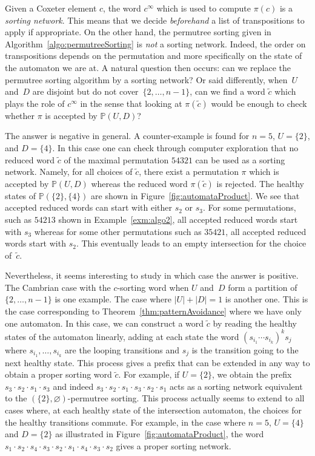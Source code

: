 \documentclass[ALCO]{cedram}
\newcommand{\defn}[1]{\textsl{\color{darkblue} #1}}
\newcommand{\automatonP}{\mathbb{P}}
\begin{document}
\begin{remark}
Given a Coxeter element $c$, the word $c^\infty$ which is used to compute $\pi(c)$ is a \defn{sorting network}. This means that we decide \emph{beforehand} a list of transpositions to apply if appropriate. On the other hand, the permutree sorting given in Algorithm~\ref{algo:permutreeSorting} is \emph{not} a sorting network. Indeed, the order on transpositions depends on the permutation and more specifically on the state of the automaton we are at. A natural question then occurs: can we replace the permutree sorting algorithm by a sorting network? Or said differently, when~$U$ and~$D$ are disjoint but do not cover~$\{2, \dots, n-1\}$, can we find a word $\tilde{c}$ which plays the role of $c^\infty$ in the sense that looking at $\pi(\tilde{c})$ would be enough to check whether $\pi$ is accepted by $\automatonP(U,D)$?

The answer is negative in general. A counter-example is found for $n = 5$, $U = \{ 2\}$, and $D=\{ 4 \}$. In this case one can check through computer exploration that no reduced word $\tilde{c}$ of the maximal permutation $54321$ can be used as a sorting network. Namely, for all choices of $\tilde{c}$, there exist a permutation $\pi$ which is accepted by $\automatonP(U,D)$ whereas the reduced word $\pi(\tilde{c})$ is rejected. The healthy states of $\automatonP(\{ 2\},\{ 4 \})$ are shown in Figure~\ref{fig:automataProduct}. We see that accepted reduced words can start with either $s_2$ or $s_3$. For some permutations, such as $54213$ shown in Example~\ref{exm:algo2}, all accepted reduced words start with $s_3$ whereas for some other permutations such as $35421$, all accepted reduced words start with $s_2$. This eventually leads to an empty intersection for the choice of~$\tilde{c}$.

Nevertheless, it seems interesting to study in which case the answer is positive. The Cambrian case with the $c$-sorting word when $U$ and~$D$ form a partition of~${\{2, \dots, n-1\}}$ is one example. The case where $|U| + |D| = 1$ is another one. This is the case corresponding to Theorem~\ref{thm:patternAvoidance} where we have only one automaton. In this case, we can construct a word $\tilde{c}$ by reading the healthy states of the automaton linearly, adding at each state the word $(s_{i_1} \cdots s_{i_k})^k s_j$ where $s_{i_1}, \dots, s_{i_k}$ are the looping transitions and $s_j$ is the transition going to the next healthy state. This process gives a prefix that can be extended in any way to obtain a proper sorting word $\tilde{c}$. For example, if $U = \{2\}$, we obtain the prefix $s_3 \cdot s_2 \cdot s_1 \cdot s_3$ and indeed $s_3 \cdot s_2 \cdot s_1 \cdot s_3 \cdot s_2 \cdot s_1$ acts as a sorting network equivalent to the $(\{2\},\varnothing)$-permutree sorting. This process actually seems to extend to all cases where, at each healthy state of the intersection automaton, the choices for the healthy transitions commute. For example, in the case where $n=5$, $U = \{ 4 \}$ and $D = \{ 2 \}$ as illustrated in Figure~\ref{fig:automataProduct}, the word $s_1 \cdot s_2 \cdot s_4 \cdot s_3 \cdot s_2 \cdot s_1 \cdot s_4 \cdot s_3 \cdot s_2$ gives a proper sorting network. 
\end{remark}



\end{document}

